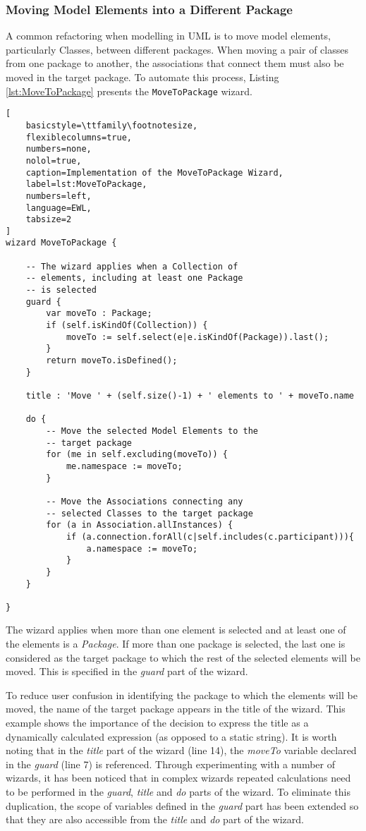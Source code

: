 \subsubsection{Moving Model Elements into a Different Package}
\label{sec:MoveToPackage}

A common refactoring when modelling in UML is to move model elements, particularly Classes, between different packages. When moving a pair of classes from one package to another, the associations that connect them must also be moved in the target package. To automate this process, Listing \ref{lst:MoveToPackage} presents the \texttt{MoveToPackage} wizard.

\begin{lstlisting}[
	basicstyle=\ttfamily\footnotesize, 
	flexiblecolumns=true, 
	numbers=none, 
	nolol=true, 
	caption=Implementation of the MoveToPackage Wizard, 
	label=lst:MoveToPackage, 
	numbers=left, 
	language=EWL, 
	tabsize=2
]
wizard MoveToPackage {
	
	-- The wizard applies when a Collection of
	-- elements, including at least one Package
	-- is selected
	guard { 
		var moveTo : Package;
		if (self.isKindOf(Collection)) {
			moveTo := self.select(e|e.isKindOf(Package)).last();
		}
		return moveTo.isDefined();
	}
	
	title : 'Move ' + (self.size()-1) + ' elements to ' + moveTo.name
	
	do {
		-- Move the selected Model Elements to the
		-- target package
		for (me in self.excluding(moveTo)) {
			me.namespace := moveTo;
		}
		
		-- Move the Associations connecting any
		-- selected Classes to the target package
		for (a in Association.allInstances) {
			if (a.connection.forAll(c|self.includes(c.participant))){
				a.namespace := moveTo;
			}
		}
	}
	
}
\end{lstlisting}

The wizard applies when more than one element is selected and at least one of the elements is a \emph{Package}. If more than one package is selected, the last one is considered as the target package to which the rest of the selected elements will be moved. This is specified in the \emph{guard} part of the wizard.

To reduce user confusion in identifying the package to which the elements will be moved, the name of the target package appears in the title of the wizard. This example shows the importance of the decision to express the title as a dynamically calculated expression (as opposed to a static string). It is worth noting that in the \emph{title} part of the wizard (line 14), the \emph{moveTo} variable declared in the \emph{guard} (line 7) is referenced. Through experimenting with a number of wizards, it has been noticed that in complex wizards repeated calculations need to be performed in the \emph{guard}, \emph{title} and \emph{do} parts of the wizard. To eliminate this duplication, the scope of variables defined in the \emph{guard} part has been extended so that they are also accessible from the \emph{title} and \emph{do} part of the wizard.
